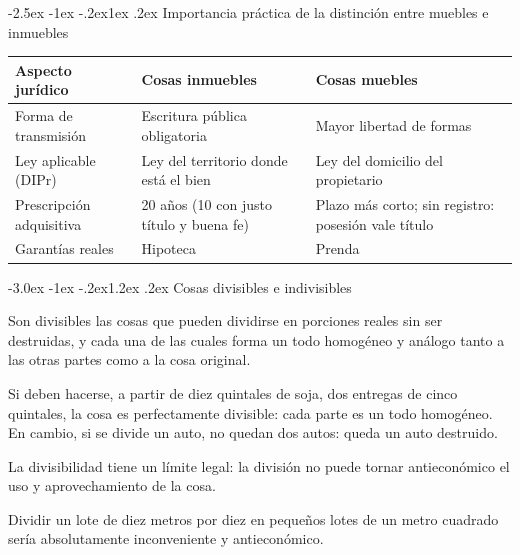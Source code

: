 \documentclass[12pt,oneside]{book}
\makeatletter
\renewcommand\section{\@startsection{section}{1}{\z@}%
  {-3.0ex \@plus -1ex \@minus -.2ex}{1.2ex \@plus .2ex}%
  {\normalfont\large\bfseries\color{acento}}}
\renewcommand\subsection{\@startsection{subsection}{2}{\z@}%
  {-2.5ex \@plus -1ex \@minus -.2ex}{1ex \@plus .2ex}%
  {\normalfont\normalsize\bfseries}}
\newenvironment{tabla}{%
    \par\medskip\begingroup\small\renewcommand{\arraystretch}{1.3}\noindent\ignorespaces
}{%
    \par\endgroup\medskip
}
\makeatother
\begin{document}
\subsection{Importancia práctica de la distinción entre muebles e inmuebles}

\begin{tabla}
\begin{tabularx}{\textwidth}{B{3.4cm}YY}
\toprule
Aspecto jurídico & \textbf{Cosas inmuebles} & \textbf{Cosas muebles} \\
\midrule
Forma de transmisión & Escritura pública obligatoria & Mayor libertad de formas \\
Ley aplicable (DIPr) & Ley del territorio donde está el bien & Ley del domicilio del propietario \\
Prescripción adquisitiva & 20 años (10 con justo título y buena fe) & Plazo más corto; sin registro: posesión vale título \\
Garantías reales & Hipoteca & Prenda \\
\bottomrule
\end{tabularx}
\end{tabla}

\section{Cosas divisibles e indivisibles}

\begin{definicion}
Son divisibles las cosas que pueden dividirse en porciones reales sin ser destruidas, y cada una de las cuales forma un todo homogéneo y análogo tanto a las otras partes como a la cosa original.
\end{definicion}

\begin{ejemplo}
Si deben hacerse, a partir de diez quintales de soja, dos entregas de cinco quintales, la cosa es perfectamente divisible: cada parte es un todo homogéneo. En cambio, si se divide un auto, no quedan dos autos: queda un auto destruido.
\end{ejemplo}

La divisibilidad tiene un límite legal: la división no puede tornar antieconómico el uso y aprovechamiento de la cosa.

\begin{ejemplo}
Dividir un lote de diez metros por diez en pequeños lotes de un metro cuadrado sería absolutamente inconveniente y antieconómico.
\end{ejemplo}
\end{document}
